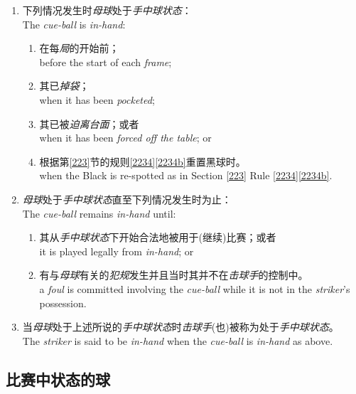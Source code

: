 \begin{enumerate}[label=(\alph*)]
    \item 下列情况发生时\emph{母球}处于\emph{手中球状态}：\\
    The \emph{cue-ball} is \emph{in-hand}:
    \begin{enumerate}[label=(\roman*)]
        \item 在每\emph{局}的开始前；\\
        before the start of each \emph{frame};
        \item 其已\emph{掉袋}；\\
        when it has been \emph{pocketed};
        \item 其已被\emph{迫离台面}；或者\\
        when it has been \emph{forced off the table}; or
        \item 根据第\ref{223}节的规则\ref{2234}\ref{2234b}重置黑球时。\\
        when the Black is re-spotted as in Section \ref{223} Rule \ref{2234}\ref{2234b}.
    \end{enumerate}
    \item \emph{母球}处于\emph{手中球状态}直至下列情况发生时为止：\\
    The \emph{cue-ball} remains \emph{in-hand} until:
    \begin{enumerate}[label=(\roman*)]
        \item 其从\emph{手中球状态}下开始合法地被用于(继续)比赛；或者\\
        it is played legally from \emph{in-hand}; or
        \item 有与\emph{母球}有关的\emph{犯规}发生并且当时其并不在\emph{击球手}的控制中。\\
        a \emph{foul} is committed involving the \emph{cue-ball} while it is not in the \emph{striker}'s possession.
    \end{enumerate}
    \item 当\emph{母球}处于上述所说的\emph{手中球状态}时\emph{击球手}(也)被称为处于\emph{手中球状态}。\\
    The \emph{striker} is said to be \emph{in-hand} when the \emph{cue-ball} is \emph{in-hand} as above.
\end{enumerate}

\subsection{比赛中状态的球}

